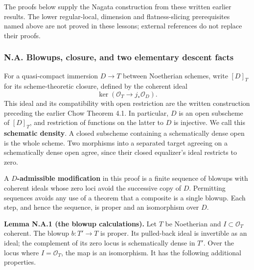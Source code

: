 \documentclass[11pt]{article}
\begin{document}
The proofs below supply the Nagata construction from these written
earlier results. The lower regular-local, dimension and flatness-slicing
prerequisites named above are not proved in these lessons; external
references do not replace their proofs.

\subsubsection{N.A. Blowups, closure, and two elementary descent
facts}\label{n.a.-blowups-closure-and-two-elementary-descent-facts}

For a quasi-compact immersion \(D\to T\) between Noetherian schemes,
write \([D]_T\) for its scheme-theoretic closure, defined by the
coherent ideal \[
\ker(\mathcal O_T\longrightarrow j_*\mathcal O_D).
\] This ideal and its compatibility with open restriction are the
written construction preceding the earlier Chow Theorem 4.1. In
particular, \(D\) is an open subscheme of \([D]_T\), and restriction of
functions on the latter to \(D\) is injective. We call this
\textbf{schematic density}. A closed subscheme containing a
schematically dense open is the whole scheme. Two morphisms into a
separated target agreeing on a schematically dense open agree, since
their closed equalizer's ideal restricts to zero.

A \textbf{\(D\)-admissible modification} in this proof is a finite
sequence of blowups with coherent ideals whose zero loci avoid the
successive copy of \(D\). Permitting sequences avoids any use of a
theorem that a composite is a single blowup. Each step, and hence the
sequence, is proper and an isomorphism over \(D\).

\textbf{Lemma N.A.1 (the blowup calculations).} Let \(T\) be Noetherian
and \(I\subset\mathcal O_T\) coherent. The blowup \(b:T'\to T\) is
proper. Its pulled-back ideal is invertible as an ideal; the complement
of its zero locus is schematically dense in \(T'\). Over the locus where
\(I=\mathcal O_T\), the map is an isomorphism. It has the following
additional properties.
\end{document}
